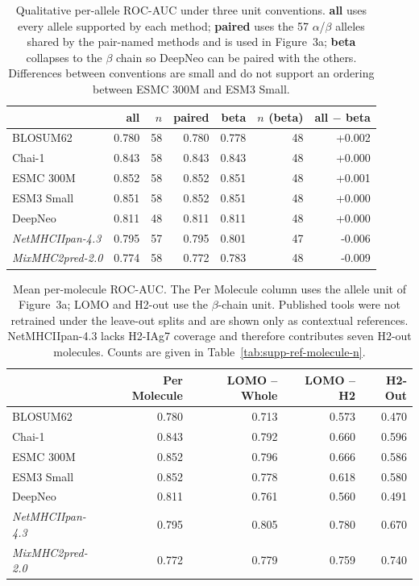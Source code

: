 \begin{table}[H]
\centering
\small
\caption{Qualitative per-allele ROC-AUC under three unit conventions. \textbf{all} uses every allele supported by each method; \textbf{paired} uses the 57 $\alpha$/$\beta$ alleles shared by the pair-named methods and is used in Figure~3a; \textbf{beta} collapses to the $\beta$ chain so DeepNeo can be paired with the others. Differences between conventions are small and do not support an ordering between ESMC 300M and ESM3 Small.}
\label{tab:supp-ref-convention}
\begin{tabular}{lrrrrrr}
\toprule
 & \textbf{all} & \textbf{$n$} & \textbf{paired} & \textbf{beta} & \textbf{$n$ (beta)} & \textbf{all $-$ beta} \\
\midrule
BLOSUM62 & 0.780 & 58 & 0.780 & 0.778 & 48 & +0.002 \\
Chai-1 & 0.843 & 58 & 0.843 & 0.843 & 48 & +0.000 \\
ESMC 300M & 0.852 & 58 & 0.852 & 0.851 & 48 & +0.001 \\
ESM3 Small & 0.851 & 58 & 0.852 & 0.851 & 48 & +0.000 \\
DeepNeo & 0.811 & 48 & 0.811 & 0.811 & 48 & +0.000 \\
\textit{NetMHCIIpan-4.3} & 0.795 & 57 & 0.795 & 0.801 & 47 & -0.006 \\
\textit{MixMHC2pred-2.0} & 0.774 & 58 & 0.772 & 0.783 & 48 & -0.009 \\
\bottomrule
\end{tabular}
\end{table}

\begin{table}[H]
\centering
\small
\caption{Mean per-molecule ROC-AUC. The Per Molecule column uses the allele unit of Figure~3a; LOMO and H2-out use the $\beta$-chain unit. Published tools were not retrained under the leave-out splits and are shown only as contextual references. NetMHCIIpan-4.3 lacks H2-IAg7 coverage and therefore contributes seven H2-out molecules. Counts are given in Table~\ref{tab:supp-ref-molecule-n}.}
\label{tab:supp-ref-molecule}
\begin{tabular}{lrrrr}
\toprule
 & \textbf{Per Molecule} & \textbf{LOMO -- Whole} & \textbf{LOMO -- H2} & \textbf{H2-Out} \\
\midrule
BLOSUM62 & 0.780 & 0.713 & 0.573 & 0.470 \\
Chai-1 & 0.843 & 0.792 & 0.660 & 0.596 \\
ESMC 300M & 0.852 & 0.796 & 0.666 & 0.586 \\
ESM3 Small & 0.852 & 0.778 & 0.618 & 0.580 \\
DeepNeo & 0.811 & 0.761 & 0.560 & 0.491 \\
\textit{NetMHCIIpan-4.3} & 0.795 & 0.805 & 0.780 & 0.670 \\
\textit{MixMHC2pred-2.0} & 0.772 & 0.779 & 0.759 & 0.740 \\
\bottomrule
\end{tabular}
\end{table}

